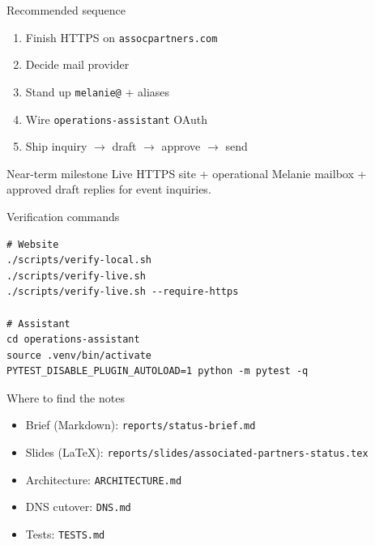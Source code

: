 \documentclass[aspectratio=169,11pt]{beamer}
\begin{document}
\begin{frame}{Recommended sequence}
  \begin{enumerate}
    \item Finish HTTPS on \texttt{assocpartners.com}
    \item Decide mail provider
    \item Stand up \texttt{melanie@} + aliases
    \item Wire \texttt{operations-assistant} OAuth
    \item Ship inquiry $\rightarrow$ draft $\rightarrow$ approve $\rightarrow$ send
  \end{enumerate}

  \vspace{0.8em}
  \begin{block}{Near-term milestone}
    Live HTTPS site + operational Melanie mailbox + approved draft replies
    for event inquiries.
  \end{block}
\end{frame}

\begin{frame}[fragile]{Verification commands}
\begin{lstlisting}[basicstyle=\ttfamily\footnotesize,breaklines=true]
# Website
./scripts/verify-local.sh
./scripts/verify-live.sh
./scripts/verify-live.sh --require-https

# Assistant
cd operations-assistant
source .venv/bin/activate
PYTEST_DISABLE_PLUGIN_AUTOLOAD=1 python -m pytest -q
\end{lstlisting}
\end{frame}

\begin{frame}{Where to find the notes}
  \begin{itemize}
    \item Brief (Markdown): \texttt{reports/status-brief.md}
    \item Slides (LaTeX): \texttt{reports/slides/associated-partners-status.tex}
    \item Architecture: \texttt{ARCHITECTURE.md}
    \item DNS cutover: \texttt{DNS.md}
    \item Tests: \texttt{TESTS.md}
  \end{itemize}
\end{frame}
\end{document}
